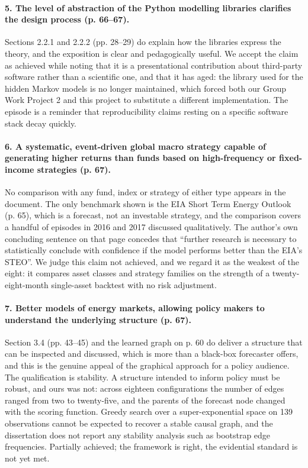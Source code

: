 \documentclass[11pt,a4paper]{article}
\begin{document}
\paragraph{5. The level of abstraction of the Python modelling libraries clarifies the design
process (p. 66--67).} Sections 2.2.1 and 2.2.2 (pp. 28--29) do explain how the libraries express
the theory, and the exposition is clear and pedagogically useful. We accept the claim as achieved
while noting that it is a presentational contribution about third-party software rather than a
scientific one, and that it has aged: the library used for the hidden Markov models is no longer
maintained, which forced both our Group Work Project 2 and this project to substitute a different
implementation. The episode is a reminder that reproducibility claims resting on a specific
software stack decay quickly.

\paragraph{6. A systematic, event-driven global macro strategy capable of generating higher returns
than funds based on high-frequency or fixed-income strategies (p. 67).} No comparison with any fund,
index or strategy of either type appears in the document. The only benchmark shown is the EIA Short
Term Energy Outlook (p. 65), which is a forecast, not an investable strategy, and the comparison
covers a handful of episodes in 2016 and 2017 discussed qualitatively. The author's own
concluding sentence on that page concedes that ``further research is necessary to statistically
conclude with confidence if the model performs better than the EIA's STEO''. We judge this claim not
achieved, and we regard it as the weakest of the eight: it compares asset classes and strategy
families on the strength of a twenty-eight-month single-asset backtest with no risk adjustment.

\paragraph{7. Better models of energy markets, allowing policy makers to understand the underlying
structure (p. 67).} Section 3.4 (pp. 43--45) and the learned graph on p. 60 do deliver a structure
that can be inspected and discussed, which is more than a black-box forecaster offers, and this is
the genuine appeal of the graphical approach for a policy audience. The qualification is
stability. A structure intended to inform policy must be robust, and ours was not: across
eighteen configurations the number of edges ranged from two to twenty-five, and the parents of the
forecast node changed with the scoring function. Greedy search over a super-exponential space on
139 observations cannot be expected to recover a stable causal graph, and the dissertation does not
report any stability analysis such as bootstrap edge frequencies. Partially achieved; the framework
is right, the evidential standard is not yet met.
\end{document}

